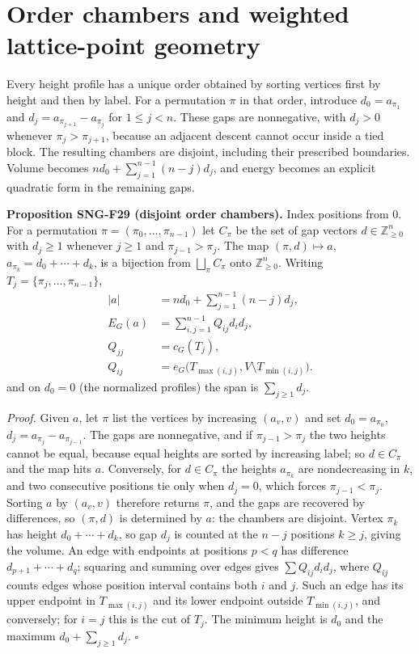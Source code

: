 \documentclass[
  11pt,
  a4paper,
]{report}
\begin{document}
\hypertarget{order-chambers-and-weighted-lattice-point-geometry}{%
\section{Order chambers and weighted lattice-point
geometry}\label{order-chambers-and-weighted-lattice-point-geometry}}

Every height profile has a unique order obtained by sorting vertices
first by height and then by label. For a permutation \(\pi\) in that
order, introduce \(d_0=a_{\pi_1}\) and \(d_j=a_{\pi_{j+1}}-a_{\pi_j}\)
for \(1\le j<n\). These gaps are nonnegative, with \(d_j>0\) whenever
\(\pi_j>\pi_{j+1}\), because an adjacent descent cannot occur inside a
tied block. The resulting chambers are disjoint, including their
prescribed boundaries. Volume becomes \(nd_0+\sum_{j=1}^{n-1}(n-j)d_j\),
and energy becomes an explicit quadratic form in the remaining gaps.

\textbf{Proposition SNG-F29 (disjoint order chambers).} Index positions
from \(0\). For a permutation \(\pi=(\pi_0,\ldots,\pi_{n-1})\) let
\(C_\pi\) be the set of gap vectors \(d\in\mathbb Z_{\ge0}^n\) with
\(d_j\ge1\) whenever \(j\ge1\) and \(\pi_{j-1}>\pi_j\). The map
\((\pi,d)\mapsto a\), \(a_{\pi_k}=d_0+\cdots+d_k\), is a bijection from
\(\bigsqcup_\pi C_\pi\) onto \(\mathbb Z_{\ge0}^n\). Writing
\(T_j=\{\pi_j,\ldots,\pi_{n-1}\}\), \[
\begin{aligned}
|a|&=nd_0+\sum_{j=1}^{n-1}(n-j)d_j,\\
E_G(a)&=\sum_{i,j=1}^{n-1}Q_{ij}d_id_j,\\
Q_{jj}&=c_G(T_j),\\
Q_{ij}&=e_G\bigl(T_{\max(i,j)},V\setminus T_{\min(i,j)}\bigr).
\end{aligned}
\] and on \(d_0=0\) (the normalized profiles) the span is
\(\sum_{j\ge1}d_j\).

\emph{Proof.} Given \(a\), let \(\pi\) list the vertices by increasing
\((a_v,v)\) and set \(d_0=a_{\pi_0}\), \(d_j=a_{\pi_j}-a_{\pi_{j-1}}\).
The gaps are nonnegative, and if \(\pi_{j-1}>\pi_j\) the two heights
cannot be equal, because equal heights are sorted by increasing label;
so \(d\in C_\pi\) and the map hits \(a\). Conversely, for \(d\in C_\pi\)
the heights \(a_{\pi_k}\) are nondecreasing in \(k\), and two
consecutive positions tie only when \(d_j=0\), which forces
\(\pi_{j-1}<\pi_j\). Sorting \(a\) by \((a_v,v)\) therefore returns
\(\pi\), and the gaps are recovered by differences, so \((\pi,d)\) is
determined by \(a\): the chambers are disjoint. Vertex \(\pi_k\) has
height \(d_0+\cdots+d_k\), so gap \(d_j\) is counted at the \(n-j\)
positions \(k\ge j\), giving the volume. An edge with endpoints at
positions \(p<q\) has difference \(d_{p+1}+\cdots+d_q\); squaring and
summing over edges gives \(\sum Q_{ij}d_id_j\), where \(Q_{ij}\) counts
edges whose position interval contains both \(i\) and \(j\). Such an
edge has its upper endpoint in \(T_{\max(i,j)}\) and its lower endpoint
outside \(T_{\min(i,j)}\), and conversely; for \(i=j\) this is the cut
of \(T_j\). The minimum height is \(d_0\) and the maximum
\(d_0+\sum_{j\ge1}d_j\). \(\square\)
\end{document}
